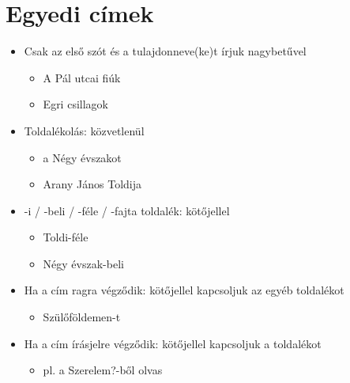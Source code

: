 \documentclass{article}
\begin{document}
\section{Egyedi címek}
\begin{itemize}
    \item Csak az első szót és a tulajdonneve(ke)t írjuk nagybetűvel
    \begin{itemize}
        \item A Pál utcai fiúk
        \item Egri csillagok
    \end{itemize}
    \item Toldalékolás: közvetlenül
    \begin{itemize}
        \item a Négy évszakot
        \item Arany János Toldija
    \end{itemize}
    \item -i / -beli / -féle / -fajta toldalék: kötőjellel
    \begin{itemize}
        \item Toldi-féle
        \item Négy évszak-beli
    \end{itemize}
    \item Ha a cím ragra végződik: kötőjellel kapcsoljuk az egyéb toldalékot
    \begin{itemize}
        \item Szülőföldemen-t
    \end{itemize}
    \item Ha a cím írásjelre végződik: kötőjellel kapcsoljuk a toldalékot
    \begin{itemize}
        \item pl. a Szerelem?-ből olvas
    \end{itemize}
\end{itemize}
\end{document}
